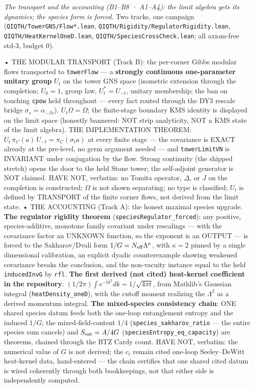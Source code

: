 \documentclass[11pt,a4paper]{article}
\begin{document}
\emph{The transport and the accounting (B1--B8 · A1--A4): the limit algebra gets its dynamics; the species form is forced.} Two tracks, one campaign (\texttt{QIQTH/TowerGNS/Flow*.lean}, \texttt{QIQTH/Rigidity/RegulatorRigidity.lean}, \texttt{QIQTH/HeatKernelOneD.lean}, \texttt{QIQTH/SpeciesCrossCheck.lean}; all axiom-free std-3, budget 0).

  • THE MODULAR TRANSPORT (Track B): the per-corner Gibbs modular flows transported to \texttt{towerFlow} — a \textbf{strongly continuous one-parameter unitary group} $U_t$ on the tower GNS space (isometric extension through the completion; $U_0 = 1$, group law, $U_t^* = U_{-t}$, unitary membership; the ban on touching \texttt{cpow} held throughout — every fact routed through the DY3 rescale bridge $\sigma_s = \alpha_{-\beta s}$). $U_t\Omega = \Omega$; the finite-stage boundary KMS identity is displayed on the limit space (honestly bannered: NOT strip analyticity, NOT a KMS state of the limit algebra). THE IMPLEMENTATION THEOREM: $U_t\,\pi_C(a)\,U_{-t} = \pi_C(\sigma_t a)$ at every finite stage — the covariance is EXACT already at the pre-level, no germ argument needed — and \texttt{towerLimitVN} is INVARIANT under conjugation by the flow. Strong continuity (the shipped stretch) opens the door to the held Stone tower; the self-adjoint generator is NOT claimed. HAVE NOT, verbatim: no Tomita operator, $\Delta$, or $J$ on the completion is constructed; $\Omega$ is not shown separating; no type is classified; $U_t$ is defined by TRANSPORT of the finite corner flows, not derived from the limit state.
  • THE ACCOUNTING (Track A): the honest maximal species upgrade. \textbf{The regulator rigidity theorem} (\texttt{speciesRegulator\_forced}): any positive, species-additive, monotone family covariant under rescalings — with the covariance factor an UNKNOWN function, so the exponent is an OUTPUT — is forced to the Sakharov/Dvali form $1/G = N_{\rm eff}\Lambda^\kappa$, with $\kappa = 2$ pinned by a single dimensional calibration, an explicit dyadic counterexample showing weakened covariance breaks the conclusion, and the non-vacuity instance equal to the held \texttt{inducedInvG} by \texttt{rfl}. \textbf{The first derived (not cited) heat-kernel coefficient in the repository}: $(1/2\pi)\int e^{-tk^2}dk = 1/\sqrt{4\pi t}$, from Mathlib's Gaussian integral (\texttt{heatDensity\_oneD}), with the cutoff moment realizing the $\Lambda^2$ as a derived momentum integral. \textbf{The mixed-species consistency chain}: ONE shared species datum feeds both the one-loop entanglement entropy and the induced $1/G$; the mixed-field-content $1/4$ (\texttt{species\_sakharov\_ratio} — the entire species sum cancels) and $S_{\rm ent} = A/4G$ (\texttt{speciesEntropy\_eq\_capacity}) are theorems, chained through the BTZ Cardy count. HAVE NOT, verbatim: the numerical value of $G$ is not derived; the $c_i$ remain cited one-loop Seeley--DeWitt heat-kernel data, hand-entered — the chain certifies that one shared cited datum is wired coherently through both bookkeepings, not that either side is independently computed.
\end{document}
